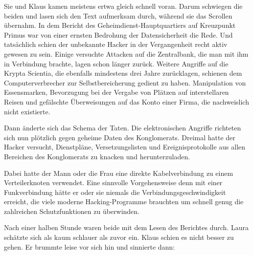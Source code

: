 \par

Sie und Klaus kamen meistens ertwa gleich schnell voran.
Darum schwiegen die beiden und lasen sich den Text aufmerksam durch, während sie das Scrollen übernahm.
In dem Bericht des Geheimdienst-Hauptquartiers auf Kreuzpunkt Primus war von einer ernsten Bedrohung der Datensicherheit die Rede. 
Und tatsächlich schien der unbekannte Hacker in der Vergangenheit recht aktiv gewesen zu sein.
Einige versuchte Attacken auf die Zentralbank, die man mit ihm in Verbindung brachte, lagen schon länger zurück.
Weitere Angriffe auf die Krypta Scientia, die ebenfalls mindestens drei Jahre zurücklagen, schienen dem Computerverbrecher zur Selbstbereicherung gedient zu haben.
Manipulation von Essensmarken, Bevorzugung bei der Vergabe von Plätzen auf interstellaren Reisen und gefälschte Überweisungen auf das Konto einer Firma, die nachweislich nicht existierte.

\par

Dann änderte sich das Schema der Taten.
Die elektronischen Angriffe richteten sich nun plötzlich gegen geheime Daten des Konglomerats.
Dreimal hatte der Hacker versucht, Dienstpläne, Versetzungslisten und Ereignisprotokolle aus allen Bereichen des Konglomerats zu knacken und herunterzuladen.

\par

Dabei hatte der Mann oder die Frau eine direkte Kabelverbindung zu einem Verteilerknoten verwendet.
Eine sinnvolle Vorgehensweise denn mit einer Funkverbindung hätte er oder sie niemals die Verbindungsgeschwindigkeit erreicht, die viele moderne Hacking-Programme brauchten um schnell genug die zahlreichen Schutzfunktionen zu überwinden.

\par

Nach einer halben Stunde waren beide mit dem Lesen des Berichtes durch.
Laura schätzte sich als kaum schlauer als zuvor ein.
Klaus schien es nicht besser zu gehen.
Er brummte leise vor sich hin und sinnierte dann: 

\par

